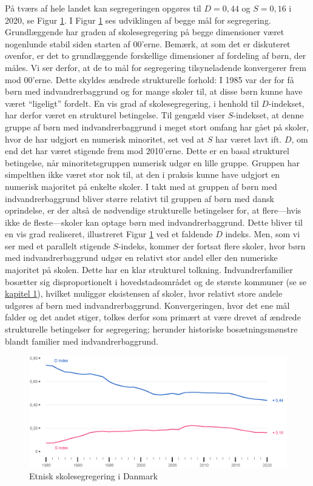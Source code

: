 \documentclass[
]{book}
\begin{document}
På tværs af hele landet kan segregeringen opgøres til \(D = 0,44\) og \(S = 0,16\) i 2020, se Figur \ref{fig:fig-4-2}. I Figur \ref{fig:fig-4-2} ses udviklingen af begge mål for segregering. Grundlæggende har graden af skolesegregering på begge dimensioner været nogenlunde stabil siden starten af 00'erne. Bemærk, at som det er diskuteret ovenfor, er det to grundlæggende forskellige dimensioner af fordeling af børn, der måles. Vi ser derfor, at de to mål for segregering tilsyneladende konvergerer frem mod 00'erne. Dette skyldes ændrede strukturelle forhold: I 1985 var der for få børn med indvandrerbaggrund og for mange skoler til, at disse børn kunne have været ``ligeligt'' fordelt. En vis grad af skolesegregering, i henhold til \(D\)-indekset, har derfor været en strukturel betingelse. Til gengæld viser \(S\)-indekset, at denne gruppe af børn med indvandrerbaggrund i meget stort omfang har gået på skoler, hvor de har udgjort en numerisk minoritet, set ved at \(S\) har været lavt ift. \(D\), om end det har været stigende frem mod 2010'erne. Dette er en basal strukturel betingelse, når minoritetsgruppen numerisk udgør en lille gruppe. Gruppen har simpelthen ikke været stor nok til, at den i praksis kunne have udgjort en numerisk majoritet på enkelte skoler. I takt med at gruppen af børn med indvandrerbaggrund bliver større relativt til gruppen af børn med dansk oprindelse, er der altså de nødvendige strukturelle betingelser for, at flere---hvis ikke de fleste---skoler kan optage børn med indvandrerbaggrund. Dette bliver til en vis grad realiseret, illustreret Figur \ref{fig:fig-4-2} ved et faldende \(D\) indeks. Men, som vi ser med et parallelt stigende \(S\)-indeks, kommer der fortsat flere skoler, hvor børn med indvandrerbaggrund udgør en relativt stor andel eller den numeriske majoritet på skolen. Dette har en klar strukturel tolkning. Indvandrerfamilier bosætter sig disproportionelt i hovedstadsområdet og de største kommuner (se se \hyperref[kap1]{kapitel 1}), hvilket muliggør eksistensen af skoler, hvor relativt store andele udgøres af børn med indvandrerbaggrund. Konvergeringen, hvor det ene mål falder og det andet stiger, tolkes derfor som primært at være drevet af ændrede strukturelle betingelser for segregering; herunder historiske bosætningsmønstre blandt familier med indvandrerbaggrund.

\begin{figure}
\includegraphics[width=1\linewidth]{images/figur_3_2} \caption{Etnisk skolesegregering i Danmark}\label{fig:fig-4-2}
\end{figure}
\end{document}
